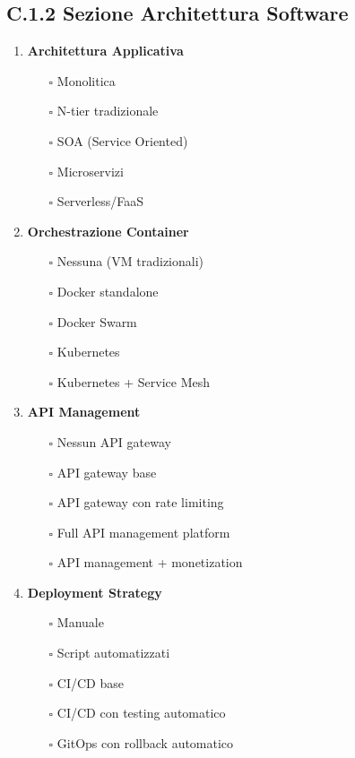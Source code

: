 \subsection{C.1.2 Sezione Architettura Software}

\begin{enumerate}
\item \textbf{Architettura Applicativa}
   \begin{itemize}
   \item[$\square$] Monolitica
   \item[$\square$] N-tier tradizionale
   \item[$\square$] SOA (Service Oriented)
   \item[$\square$] Microservizi
   \item[$\square$] Serverless/FaaS
   \end{itemize}

\item \textbf{Orchestrazione Container}
   \begin{itemize}
   \item[$\square$] Nessuna (VM tradizionali)
   \item[$\square$] Docker standalone
   \item[$\square$] Docker Swarm
   \item[$\square$] Kubernetes
   \item[$\square$] Kubernetes + Service Mesh
   \end{itemize}

\item \textbf{API Management}
   \begin{itemize}
   \item[$\square$] Nessun API gateway
   \item[$\square$] API gateway base
   \item[$\square$] API gateway con rate limiting
   \item[$\square$] Full API management platform
   \item[$\square$] API management + monetization
   \end{itemize}

\item \textbf{Deployment Strategy}
   \begin{itemize}
   \item[$\square$] Manuale
   \item[$\square$] Script automatizzati
   \item[$\square$] CI/CD base
   \item[$\square$] CI/CD con testing automatico
   \item[$\square$] GitOps con rollback automatico
   \end{itemize}
\end{enumerate}

